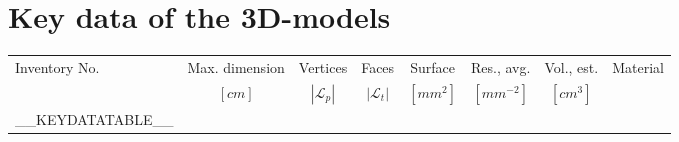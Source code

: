 \section*{Key data of the 3D-models}

\begin{center}\scriptsize %
  \begin{tabular}[!hptb]{|l|c|r|r|r|r|r|l|}
    \hline
    Inventory No.  &
    \multicolumn{1}{c|}{Max. dimension} &
    \multicolumn{1}{c|}{Vertices}   &
    \multicolumn{1}{c|}{Faces}      &
    \multicolumn{1}{c|}{Surface}    &
    \multicolumn{1}{c|}{Res., avg.} &
    \multicolumn{1}{c|}{Vol., est.} &
    Material \\
    &
    \multicolumn{1}{c|}{$[cm]$} &
    \multicolumn{1}{c|}{$|\mathcal{L}_{p}|$} &
    \multicolumn{1}{c|}{$|\mathcal{L}_{t}|$} &
    \multicolumn{1}{c|}{$[mm^2]$} &
    \multicolumn{1}{c|}{$[mm^{-2}]$} &
    \multicolumn{1}{c|}{$[cm^3]$} &
    \\
    \hline
    \hline

__KEYDATATABLE__

  \end{tabular}
\end{center} 
